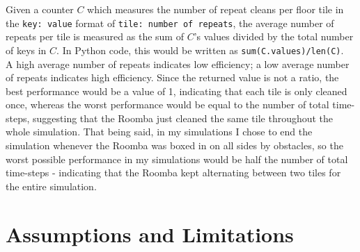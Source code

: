 \documentclass[11pt]{article}
\begin{document}
Given a counter \(C\) which measures the number of repeat cleans per
floor tile in the \texttt{key:\ value} format of
\texttt{tile:\ number\ of\ repeats}, the average number of repeats per
tile is measured as the sum of \(C\)'s values divided by the total
number of keys in \(C\). In Python code, this would be written as
\texttt{sum(C.values)/len(C)}.\\

A high average number of repeats indicates low efficiency; a low average
number of repeats indicates high efficiency. Since the returned value is
not a ratio, the best performance would be a value of 1, indicating that
each tile is only cleaned once, whereas the worst performance would be
equal to the number of total time-steps, suggesting that the Roomba just
cleaned the same tile throughout the whole simulation. That being said,
in my simulations I chose to end the simulation whenever the Roomba was
boxed in on all sides by obstacles, so the worst possible performance in
my simulations would be half the number of total time-steps - indicating
that the Roomba kept alternating between two tiles for the entire
simulation.

\section{Assumptions and Limitations}
\end{document}
